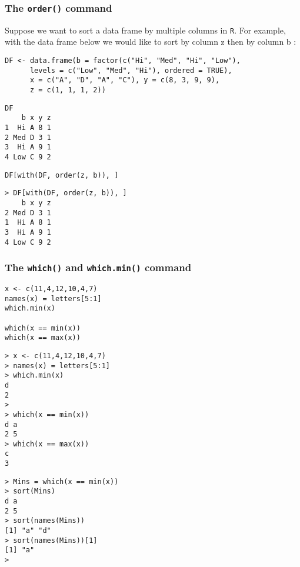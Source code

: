 \documentclass[]{article}
\begin{document}
\subsubsection{The \texttt{order()} command}
Suppose we want to sort a data frame by multiple columns in \texttt{R}. 
For example, with the data frame below we would like to sort by column z  then by column b :
\begin{framed}
\begin{verbatim}
DF <- data.frame(b = factor(c("Hi", "Med", "Hi", "Low"), 
      levels = c("Low", "Med", "Hi"), ordered = TRUE),
      x = c("A", "D", "A", "C"), y = c(8, 3, 9, 9),
      z = c(1, 1, 1, 2))
\end{verbatim} 
\end{framed}     
\begin{verbatim}
DF
    b x y z
1  Hi A 8 1
2 Med D 3 1
3  Hi A 9 1
4 Low C 9 2
\end{verbatim}
\begin{framed}
\begin{verbatim}
DF[with(DF, order(z, b)), ]
\end{verbatim}
\end{framed}
\begin{verbatim}
> DF[with(DF, order(z, b)), ]
    b x y z
2 Med D 3 1
1  Hi A 8 1
3  Hi A 9 1
4 Low C 9 2
\end{verbatim}


\subsubsection{The \texttt{which()} and \texttt{which.min()} command}

\begin{framed}
\begin{verbatim}
x <- c(11,4,12,10,4,7)
names(x) = letters[5:1]
which.min(x)

which(x == min(x))
which(x == max(x))
\end{verbatim}
\end{framed}

\begin{verbatim}
> x <- c(11,4,12,10,4,7)
> names(x) = letters[5:1]
> which.min(x)
d 
2 
> 
> which(x == min(x))
d a 
2 5 
> which(x == max(x))
c 
3 
\end{verbatim}

\begin{verbatim}
> Mins = which(x == min(x))
> sort(Mins)
d a 
2 5 
> sort(names(Mins))
[1] "a" "d"
> sort(names(Mins))[1]
[1] "a"
> 
\end{verbatim}
\newpage
\end{document}
